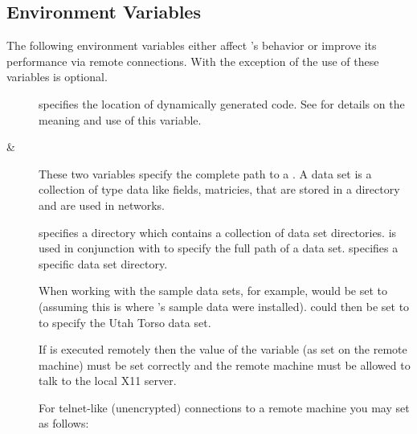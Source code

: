 \subsection{Environment Variables}
\label{sec:environ} 

\newcommand{\envitem}[1]{\item[\envvar{#1}]\mbox{}}

The following environment variables either affect \sr{}'s behavior or
improve its performance via remote connections.  With the exception of
 the use of these variables is
optional.

\begin{description}
\envitem{SCIRUN\_ON\_THE\_FLY\_LIBS\_DIR}
  
   specifies the location of
  dynamically generated code.  See  for details on the meaning and use of
  this variable.

\item[ \& ]\mbox{}

  These two variables specify the complete path to a \sr{} .  A data set is a collection of \sr{} type data like fields,
  matricies, \etc{} that are stored in a directory and are used in
  \sr{} networks.

   specifies a directory which contains a
  collection of data set directories.   is used in
  conjunction with  to specify the full path of
  a data set.   specifies a specific data set
  directory. 

  When working with the sample \sr{} data sets, for example,
   would be set to
   (assuming this is where \sr{}'s
  sample data were installed).   could then be
  set to  to specify the Utah Torso data set.
  
\envitem{DISPLAY}
  
  If \sr{} is executed remotely then the value of the
   variable (as set on the remote machine) must
  be set correctly and the remote machine must be allowed to
  talk to the local X11 server.
  
  For telnet-like (unencrypted) connections to a remote machine
  you may set  as follows:


\end{description}
